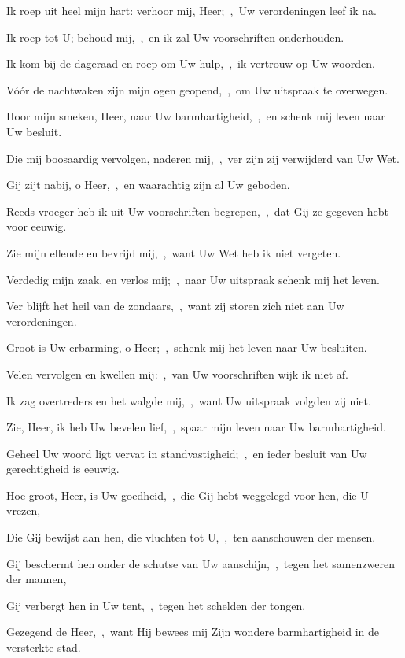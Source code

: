 \documentclass[12pt,twoside,a5paper]{article}
\begin{document}
\begin{halfparskip}
   

  Ik roep uit heel mijn hart: verhoor mij, Heer;~\sep\ Uw verordeningen leef ik na.


  Ik roep tot U; behoud mij,~\sep\ en ik zal Uw voorschriften onderhouden.

  Ik kom bij de dageraad en roep om Uw hulp,~\sep\ ik vertrouw op Uw woorden.

  Vóór de nachtwaken zijn mijn ogen geopend,~\sep\ om Uw uitspraak te overwegen.

  Hoor mijn smeken, Heer, naar Uw barmhartigheid,~\sep\ en schenk mij leven naar Uw besluit.

  Die mij boosaardig vervolgen, naderen mij,~\sep\ ver zijn zij verwijderd van Uw Wet.

  Gij zijt nabij, o Heer,~\sep\ en waarachtig zijn al Uw geboden.

  Reeds vroeger heb ik uit Uw voorschriften begrepen,~\sep\ dat Gij ze gegeven hebt voor eeuwig.

  Zie mijn ellende en bevrijd mij,~\sep\ want Uw Wet heb ik niet vergeten.

  Verdedig mijn zaak, en verlos mij;~\sep\ naar Uw uitspraak schenk mij het leven.

  Ver blijft het heil van de zondaars,~\sep\ want zij storen zich niet aan Uw verordeningen.

  Groot is Uw erbarming, o Heer;~\sep\ schenk mij het leven naar Uw besluiten.

  Velen vervolgen en kwellen mij:~\sep\ van Uw voorschriften wijk ik niet af.

  Ik zag overtreders en het walgde mij,~\sep\ want Uw uitspraak volgden zij niet.

  Zie, Heer, ik heb Uw bevelen lief,~\sep\ spaar mijn leven naar Uw barmhartigheid.

  Geheel Uw woord ligt vervat in standvastigheid;~\sep\ en ieder besluit van Uw gerechtigheid is eeuwig.
\end{halfparskip}

\begin{halfparskip}
   

  Hoe groot, Heer, is Uw goedheid,~\sep\ die Gij hebt weggelegd voor hen, die U vrezen,


  Die Gij bewijst aan hen, die vluchten tot U,~\sep\ ten aanschouwen der mensen.

  Gij beschermt hen onder de schutse van Uw aanschijn,~\sep\ tegen het samenzweren der mannen,

  Gij verbergt hen in Uw tent,~\sep\ tegen het schelden der tongen.

  Gezegend de Heer,~\sep\ want Hij bewees mij Zijn wondere barmhartigheid in de versterkte stad.
\end{halfparskip}
\end{document}
